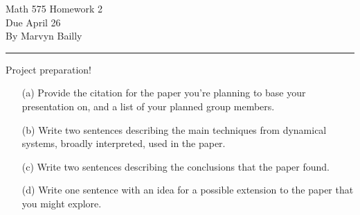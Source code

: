 \documentclass[12pt]{report}
\begin{document}
\large

\begin{center}
 Math 575 Homework 2\\
 Due April 26\\
 By Marvyn Bailly\\
\end{center}

\normalsize

\hrule



\begin{problem}
    Project preparation!
    \begin{enumerate}
        \item [(a)] Provide the citation for the paper you're planning to base your presentation on, and a list of your planned group members.  
        \item [(b)]  Write two sentences describing the main techniques from dynamical systems, broadly interpreted, used in the paper.  
        \item[(c)]  Write two sentences describing the conclusions that the paper found.  
        \item[(d)]  Write one sentence with an idea for a possible extension to the paper that you might explore.
    \end{enumerate}
\end{problem}
\end{document}
